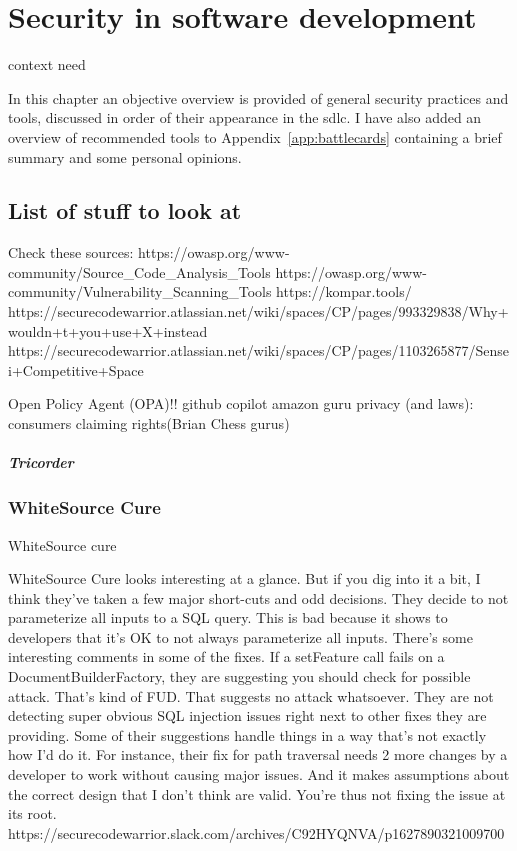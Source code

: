 \chapter{Security in software development}
\label{ch:related}

context
need

In this chapter an objective overview is provided of general security practices and tools, discussed in order of their appearance in the \gls{sdlc}.
I have also added an overview of recommended tools to Appendix~\ref{app:battlecards} containing a brief summary and some personal opinions.








\section*{List of stuff to look at}
Check these sources: 
https://owasp.org/www-community/Source\_Code\_Analysis\_Tools
https://owasp.org/www-community/Vulnerability\_Scanning\_Tools
https://kompar.tools/
https://securecodewarrior.atlassian.net/wiki/spaces/CP/pages/993329838/Why+wouldn+t+you+use+X+instead
https://securecodewarrior.atlassian.net/wiki/spaces/CP/pages/1103265877/Sensei+Competitive+Space

Open Policy Agent (OPA)!!
github copilot
amazon guru
privacy (and laws): consumers claiming rights(Brian Chess gurus)
\paragraph{Tricorder}
\subsection{WhiteSource Cure}
WhiteSource cure

WhiteSource Cure looks interesting at a glance. But if you dig into it a bit, I think they’ve taken a few major short-cuts and odd decisions.
They decide to not parameterize all inputs to a SQL query. This is bad because it shows to developers that it’s OK to not always parameterize all inputs.
There’s some interesting comments in some of the fixes. If a setFeature call fails on a DocumentBuilderFactory, they are suggesting you should check for possible attack. That’s kind of FUD. That suggests no attack whatsoever.
They are not detecting super obvious SQL injection issues right next to other fixes they are providing.
Some of their suggestions handle things in a way that’s not exactly how I’d do it. For instance, their fix for path traversal needs 2 more changes by a developer to work without causing major issues. And it makes assumptions about the correct design that I don’t think are valid. You’re thus not fixing the issue at its root.
https://securecodewarrior.slack.com/archives/C92HYQNVA/p1627890321009700

